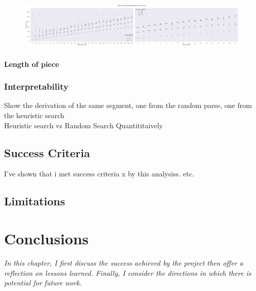 \documentclass[12pt,a4paper,twoside,openany]{report} \usepackage[pdfborder={0 0 0}]{hyperref}    %
\theoremstyle{definition} \newtheorem{definition}{Definition}[section]
\begin{document}
  \begin{figure}[h]
    \begin{center}
      \includegraphics[width=\textwidth]{figs/eval/extParamsRuntime.png}
    \end{center}
    \caption{}
    \label{fig:}
  \end{figure}

  \subsubsection{Length of piece}

  \subsection{Interpretability}
  \label{sub:evalInterpret}
  Show the derivation of the same segment, one from the random parse, one from the heuristic search\\
  Heuristic search vs Random Search Quantititaively \\


\section{Success Criteria}
\label{sec:successCriteriaEval}

I've shown that i met success criteria x by this analysiss. etc.

\section{Limitations}
\label{sec:evalLimitations}



      \chapter{Conclusions} 
      \textit{In this chapter, I first discuss the success achieved by the project then offer
      a reflection on lessons learned. Finally, I consider the directions in which there is potential for future work.}
\end{document}
